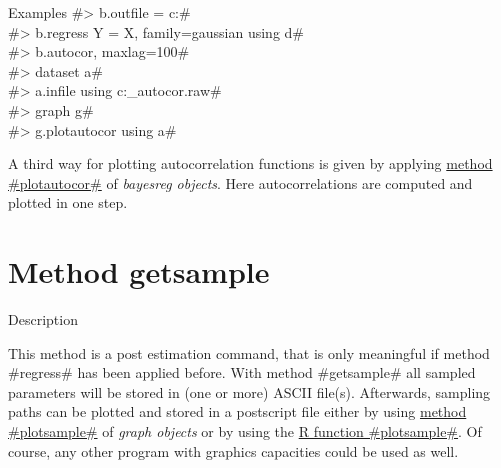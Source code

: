 \begin{stanza}{Examples}
#> b.outfile = c:\data{}# \\
#> b.regress Y = X, family=gaussian using d# \\
#> b.autocor, maxlag=100# \\
#> dataset a# \\
#> a.infile using c:\data{}_autocor.raw# \\
#> graph g# \\
#> g.plotautocor using a#

A third way for plotting autocorrelation functions is given by
applying \hyperref[plotautocor]{method #plotautocor#} of {\em
bayesreg objects}. Here autocorrelations are computed and plotted in
one step.
\end{stanza}

\clearpage

\section{Method getsample}
\label{bayesgetsample} 

\begin{stanza}{Description}

This method is a post estimation command, that is only meaningful if
method #regress# has been applied before. With method #getsample#
all sampled parameters will be stored in (one or more) ASCII
file(s). Afterwards, sampling paths can be plotted and stored in a
postscript file either by using \hyperref[graphplotsample]{method
#plotsample#} of {\em graph objects} or by using the
\hyperref[rpackage]{R function #plotsample#}. Of
course, any other program with graphics capacities could be used as
well.
\end{stanza}

